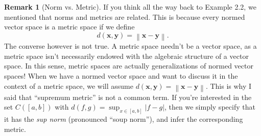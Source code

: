 \documentclass{article}
\newcommand{\x}{\mathbf{x}}
\newcommand{\y}{\mathbf{y}}
\newcommand{\norm}[1]{\left\lVert#1\right\rVert}
\theoremstyle{definition}
\newtheorem{remark}{Remark}[section]
\begin{document}
	\begin{remark}[Norm vs. Metric]
		If you think all the way back to Example 2.2, we mentioned that norms and metrics are related. This is because every normed vector space is a metric space if we define $$ d(\x,\y)=\norm{\x-\y}.$$ The converse however is not true. A metric space needn't be a vector space, as a metric space isn't necessarily endowed with the algebraic structure of a vector space. In this sense, metric spaces are actually generalizations of normed vector spaces! When we have a normed vector space and want to discuss it in the context of a metric space, we will assume $ d(\x,\y)=\norm{\x-\y}.$ This is why I said that ``supremum metric'' is not a common term. If you're interested in the set $ C([a,b]) $ with $ d(f,g)=\sup_{x\in [a,b]}|f-g| $, then we simply specify that it has the \textit{\color{red}sup norm} (pronounced ``soup norm''), and infer the corresponding metric. 
	\end{remark}
	
\end{document}
